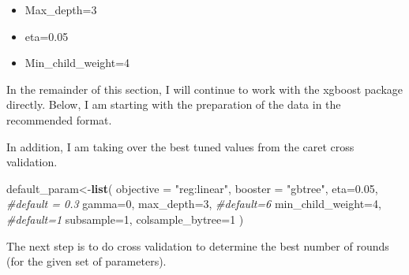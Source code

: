 \documentclass[]{article}
\newenvironment{Shaded}{\begin{snugshade}}{\end{snugshade}}
\newcommand{\KeywordTok}[1]{\textcolor[rgb]{0.13,0.29,0.53}{\textbf{#1}}}
\newcommand{\DataTypeTok}[1]{\textcolor[rgb]{0.13,0.29,0.53}{#1}}
\newcommand{\DecValTok}[1]{\textcolor[rgb]{0.00,0.00,0.81}{#1}}
\newcommand{\FloatTok}[1]{\textcolor[rgb]{0.00,0.00,0.81}{#1}}
\newcommand{\StringTok}[1]{\textcolor[rgb]{0.31,0.60,0.02}{#1}}
\newcommand{\CommentTok}[1]{\textcolor[rgb]{0.56,0.35,0.01}{\textit{#1}}}
\newcommand{\OperatorTok}[1]{\textcolor[rgb]{0.81,0.36,0.00}{\textbf{#1}}}
\newcommand{\NormalTok}[1]{#1}
\providecommand{\tightlist}{%
  \setlength{\itemsep}{0pt}\setlength{\parskip}{0pt}}
\begin{document}
\begin{itemize}
\tightlist
\item
  Max\_depth=3
\item
  eta=0.05
\item
  Min\_child\_weight=4
\end{itemize}

In the remainder of this section, I will continue to work with the
xgboost package directly. Below, I am starting with the preparation of
the data in the recommended format.

\begin{Shaded}
\end{Shaded}

In addition, I am taking over the best tuned values from the caret cross
validation.

\begin{Shaded}
\begin{Highlighting}[]
\NormalTok{default_param<-}\KeywordTok{list}\NormalTok{(}
        \DataTypeTok{objective =} \StringTok{"reg:linear"}\NormalTok{,}
        \DataTypeTok{booster =} \StringTok{"gbtree"}\NormalTok{,}
        \DataTypeTok{eta=}\FloatTok{0.05}\NormalTok{, }\CommentTok{#default = 0.3}
        \DataTypeTok{gamma=}\DecValTok{0}\NormalTok{,}
        \DataTypeTok{max_depth=}\DecValTok{3}\NormalTok{, }\CommentTok{#default=6}
        \DataTypeTok{min_child_weight=}\DecValTok{4}\NormalTok{, }\CommentTok{#default=1}
        \DataTypeTok{subsample=}\DecValTok{1}\NormalTok{,}
        \DataTypeTok{colsample_bytree=}\DecValTok{1}
\NormalTok{)}
\end{Highlighting}
\end{Shaded}

The next step is to do cross validation to determine the best number of
rounds (for the given set of parameters).
\end{document}
